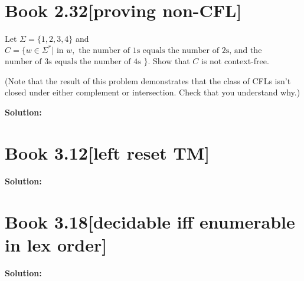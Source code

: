 \documentclass[11pt]{article}
\newenvironment{question}[2]
{\newpage\section{#1\texorpdfstring{\hfill}{horizontal spacing}{\rm\normalsize #2}}}{}
\newenvironment{solution}
{\textbf{Solution: }\color{blue}}
{\color{black}}
\begin{document}

\begin{question}{Book 2.32}{[proving non-CFL]}


Let \(\Sigma = \{1,2,3,4\}\) and \(C=\{w \in \Sigma^* | \text{ in } w, \text{ the number of 1s equals the number of 2s, and the }\) \(\text{number of 3s equals the number of 4s }\}\). Show that \(C\) is not context-free.

(Note that the result of this problem demonstrates that the class of CFLs isn’t closed under either complement or intersection. Check that you understand why.)

\begin{solution}



\end{solution}
\end{question}


\begin{question}{Book 3.12}{[left reset TM]}



\begin{solution}



\end{solution}
\end{question}


\begin{question}{Book 3.18}{[decidable iff enumerable in lex order]}



\begin{solution}



\end{solution}
\end{question}

\end{document}
